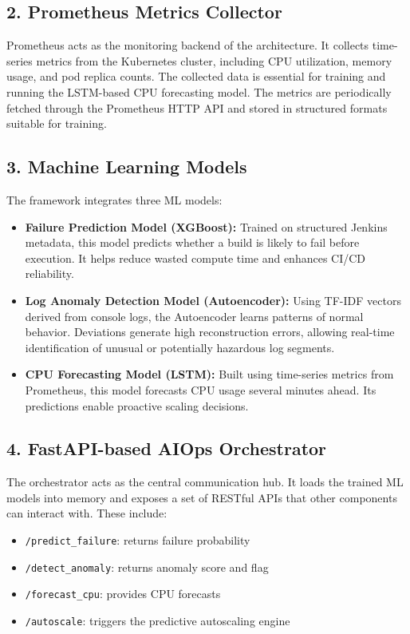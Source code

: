 \documentclass[12pt]{report}
\begin{document}
\subsection*{2. Prometheus Metrics Collector}
Prometheus acts as the monitoring backend of the architecture. It collects time-series metrics from the Kubernetes cluster, including CPU utilization, memory usage, and pod replica counts. The collected data is essential for training and running the LSTM-based CPU forecasting model. The metrics are periodically fetched through the Prometheus HTTP API and stored in structured formats suitable for training.

\subsection*{3. Machine Learning Models}
The framework integrates three ML models:

\begin{itemize}
    \item \textbf{Failure Prediction Model (XGBoost):} Trained on structured Jenkins metadata, this model predicts whether a build is likely to fail before execution. It helps reduce wasted compute time and enhances CI/CD reliability.
    \item \textbf{Log Anomaly Detection Model (Autoencoder):} Using TF-IDF vectors derived from console logs, the Autoencoder learns patterns of normal behavior. Deviations generate high reconstruction errors, allowing real-time identification of unusual or potentially hazardous log segments.
    \item \textbf{CPU Forecasting Model (LSTM):} Built using time-series metrics from Prometheus, this model forecasts CPU usage several minutes ahead. Its predictions enable proactive scaling decisions.
\end{itemize}

\subsection*{4. FastAPI-based AIOps Orchestrator}
The orchestrator acts as the central communication hub. It loads the trained ML models into memory and exposes a set of RESTful APIs that other components can interact with. These include:

\begin{itemize}
    \item \texttt{/predict\_failure}: returns failure probability
    \item \texttt{/detect\_anomaly}: returns anomaly score and flag
    \item \texttt{/forecast\_cpu}: provides CPU forecasts
    \item \texttt{/autoscale}: triggers the predictive autoscaling engine
\end{itemize}
\end{document}
